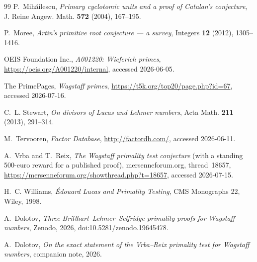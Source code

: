 \documentclass[11pt]{amsart}
\theoremstyle{plain}
\theoremstyle{definition}
\theoremstyle{remark}
\numberwithin{equation}{section}
\begin{document}
\begin{thebibliography}{99}
 P.~Mih{\u a}ilescu, \emph{Primary cyclotomic units and a proof of Catalan's conjecture}, J. Reine Angew. Math. \textbf{572} (2004), 167--195.

 P.~Moree, \emph{Artin's primitive root conjecture --- a survey}, Integers \textbf{12} (2012), 1305--1416.

 OEIS Foundation Inc., \emph{A001220: Wieferich primes}, \url{https://oeis.org/A001220/internal}, accessed 2026-06-05.

 The PrimePages, \emph{Wagstaff primes}, \url{https://t5k.org/top20/page.php?id=67}, accessed 2026-07-16.

 C.~L. Stewart, \emph{On divisors of Lucas and Lehmer numbers}, Acta Math. \textbf{211} (2013), 291--314.

 M.~Tervooren, \emph{Factor Database}, \url{http://factordb.com/}, accessed 2026-06-11.

 A.~Vrba and T.~Reix, \emph{The Wagstaff primality test conjecture} (with a standing 500-euro reward for a published proof), mersenneforum.org, thread~18657, \url{https://mersenneforum.org/showthread.php?t=18657}, accessed 2026-07-15.

 H.~C. Williams, \emph{\'Edouard Lucas and Primality Testing}, CMS Monographs 22, Wiley, 1998.

 A.~Dolotov, \emph{Three Brillhart--Lehmer--Selfridge primality proofs for Wagstaff numbers}, Zenodo, 2026, doi:10.5281/zenodo.19645478.

 A.~Dolotov, \emph{On the exact statement of the Vrba--Reix primality test for Wagstaff numbers}, companion note, 2026.

\end{thebibliography}
\end{document}
